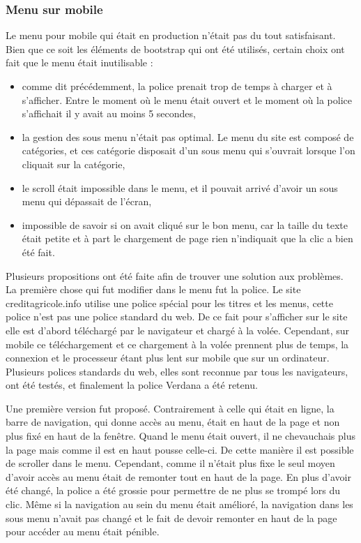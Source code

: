 \documentclass[12pt,a4paper]{article}
\begin{document}
\subsubsection{Menu sur mobile}
Le menu pour mobile qui était en production n'était pas du tout satisfaisant.\\
Bien que ce soit les éléments de bootstrap qui ont été utilisés, certain choix ont fait que le menu était inutilisable : 
\begin{itemize}
\item comme dit précédemment, la police prenait trop de temps à charger et à s'afficher. Entre le moment où le menu était ouvert et le moment où la police s'affichait il y avait au moins 5 secondes,
\item la gestion des sous menu n'était pas optimal. Le menu du site est composé de catégories, et ces catégorie disposait d'un sous menu qui s'ouvrait lorsque l'on cliquait sur la catégorie,
\item le scroll était impossible dans le menu, et il pouvait arrivé d'avoir un sous menu qui dépassait de l'écran,
\item impossible de savoir si on avait cliqué sur le bon menu, car la taille du texte était petite et à part le chargement de page rien n'indiquait que la clic a bien été fait.
\end{itemize}\par 
Plusieurs propositions ont été faite afin de trouver une solution aux problèmes. La première chose qui fut modifier dans le menu fut la police. Le site creditagricole.info utilise une police spécial pour les titres et les menus, cette police n'est pas une police standard du web. De ce fait pour s'afficher sur le site elle est d'abord téléchargé par le navigateur et chargé à la volée. Cependant, sur mobile ce téléchargement et ce chargement à la volée prennent plus de temps, la connexion et le processeur étant plus lent sur mobile que sur un ordinateur. Plusieurs polices standards du web, elles sont reconnue par tous les navigateurs, ont été testés, et finalement la police Verdana a été retenu.\par
Une première version fut proposé. Contrairement à celle qui était en ligne, la barre de navigation, qui donne accès au menu, était en haut de la page et non plus fixé en haut de la fenêtre. Quand le menu était ouvert, il ne chevauchais plus la page mais comme il est en haut pousse celle-ci. De cette manière il est possible de scroller dans le menu. Cependant, comme il n'était plus fixe le seul moyen d'avoir accès au menu était de remonter tout en haut de la page. En plus d'avoir été changé, la police a été grossie pour permettre de ne plus se trompé lors du clic. Même si la navigation au sein du menu était amélioré, la navigation dans les sous menu n'avait pas changé et le fait de devoir remonter en haut de la page pour accéder au menu était pénible.\par
\end{document}
